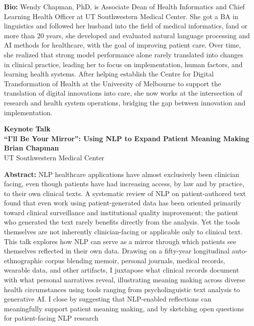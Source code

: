 \documentclass[11pt,oneside]{book}
\begin{document}
    \textbf{Bio:} Wendy Chapman, PhD, is Associate Dean of Health Informatics and Chief Learning Health Officer at UT Southwestern Medical Center. She got a BA in linguistics and followed her husband into the field of medical informatics, fand or more than 20 years, she developed and evaluated natural language processing and AI methods for healthcare, with the goal of improving patient care. Over time, she realized that strong model performance alone rarely translated into changes in clinical practice, leading her to focus on implementation, human factors, and learning health systems. After helping establish the Centre for Digital Transformation of Health at the University of Melbourne to support the translation of digital innovations into care, she now works at the intersection of research and health system operations, bridging the gap between innovation and implementation.
  \newpage
  \begin{center}
          {\Large \textbf{Keynote Talk}\\}
      {\LARGE \textbf{``I'll Be Your Mirror”: Using NLP to Expand Patient Meaning Making}\\}
        \vspace*{0.5cm}
    \textbf{Brian Chapman}\\
        UT Southwestern Medical Center\\
        
        
                
  \end{center}

  \vspace*{0.2cm}
    \textbf{Abstract:} NLP healthcare applications have almost exclusively been clinician facing, even though patients have had increasing access, by law and by practice, to their own clinical texts. A systematic review of NLP on patient-authored text found that even work using patient-generated data has been oriented primarily toward clinical surveillance and institutional quality improvement; the patient who generated the text rarely benefits directly from the analysis. Yet the tools themselves are not inherently clinician-facing or applicable only to clinical text. This talk explores how NLP can serve as a mirror through which patients see themselves reflected in their own data. Drawing on a fifty-year longitudinal auto-ethnographic corpus blending memoir, personal journals, medical records, wearable data, and other artifacts, I juxtapose what clinical records document with what personal narratives reveal, illustrating meaning making across diverse health circumstances using tools ranging from psycholinguistic text analysis to generative AI. I close by suggesting that NLP-enabled reflections can meaningfully support patient meaning making, and by sketching open questions for patient-facing NLP research\\
  \newline
  
\end{document}
